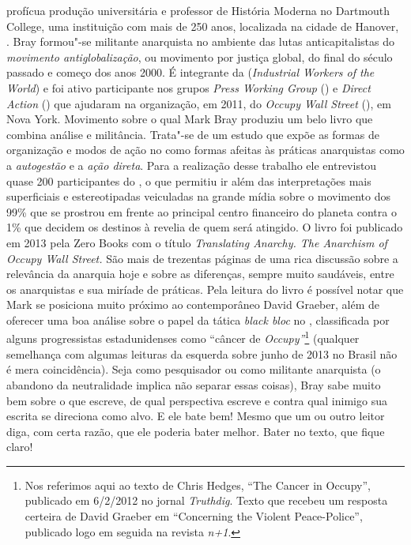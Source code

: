 \noindent{}profícua
produção universitária e professor de História Moderna no Dartmouth 
College, uma instituição com mais de 250 anos, localizada na cidade de
Hanover, . Bray formou"-se militante anarquista no ambiente das lutas
anticapitalistas do \emph{movimento antiglobalização}, ou movimento por
justiça global, do final do século passado e começo dos anos 2000. É
integrante da  (\emph{Industrial Workers of the World}) e foi ativo
participante nos grupos \emph{Press Working Group} () e \emph{Direct Action} ()
que ajudaram na organização, em 2011, do \emph{Occupy Wall Street} (), em
Nova York. Movimento sobre o qual Mark Bray produziu um belo livro que
combina análise e militância. Trata"-se de um estudo que expõe as formas
de organização e modos de ação no  como formas afeitas às práticas
anarquistas como a \emph{autogestão} e a \emph{ação direta}. Para a
realização desse trabalho ele entrevistou quase 200 participantes do
, o que permitiu ir além das interpretações mais superficiais e
estereotipadas veiculadas na grande mídia sobre o movimento dos 99\% que
se prostrou em frente ao principal centro financeiro do planeta contra o
1\% que decidem os destinos à revelia de quem será atingido. O livro foi
publicado em 2013 pela Zero Books com o título \emph{Translating
Anarchy. The Anarchism of Occupy Wall Street.} São mais de trezentas
páginas de uma rica discussão sobre a relevância da anarquia hoje e
sobre as diferenças, sempre muito saudáveis, entre os anarquistas e sua
miríade de práticas. Pela leitura do livro é possível notar que Mark se
posiciona muito próximo ao contemporâneo David Graeber, além de oferecer
uma boa análise sobre o papel da tática \emph{black bloc} no ,
classificada por alguns progressistas estadunidenses como ``câncer de
\emph{Occupy''}\footnote{Nos referimos aqui ao texto de Chris Hedges,
  ``The Cancer in Occupy'', publicado em 6/2/2012 no jornal \emph{Truthdig}.
  Texto que recebeu um resposta certeira de David Graeber em
  ``Concerning the Violent Peace-Police'', publicado logo em seguida na
  revista \emph{n+1}.} (qualquer semelhança com
algumas leituras da esquerda sobre junho de 2013 no Brasil não é mera
coincidência). Seja como pesquisador ou como militante anarquista (o
abandono da neutralidade implica não separar essas coisas), Bray sabe
muito bem sobre o que escreve, de qual perspectiva escreve e contra qual
inimigo sua escrita se direciona como alvo. E ele bate bem! Mesmo que um
ou outro leitor diga, com certa razão, que ele poderia bater melhor.
Bater no texto, que fique claro!

